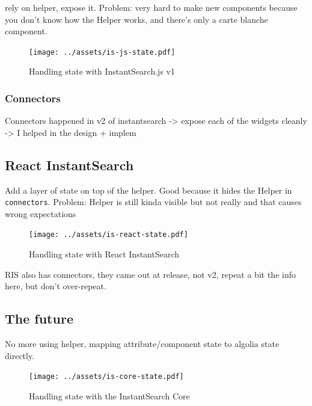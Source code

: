 rely on helper, expose it. Problem: very hard to make new components because you don't know how the Helper works, and there's only a carte blanche component. %

\begin{figure}[H]
\label{figure:is-js-state}
  \centering
  \texttt{[image: ../assets/is-js-state.pdf]}
  \caption{Handling state with InstantSearch.js v1}
\end{figure}

\subsubsection{Connectors} %
\label{ssub:instantsearch_js_connectors}

Connectors happened in v2 of instantsearch
-> expose each of the widgets cleanly
-> I helped in the design + implem %



\subsection{React InstantSearch} %
\label{sub:react_instantearch}

Add a layer of state on top of the helper. Good because it hides the Helper in {\tt connectors}. Problem: Helper is still kinda visible but not really and that causes wrong expectations %

\begin{figure}[H]
\label{figure:is-react-state}
  \centering
  \texttt{[image: ../assets/is-react-state.pdf]}
  \caption{Handling state with React InstantSearch}
\end{figure}

RIS also has connectors, they came out at release, not v2, repeat a bit the info here, but don't over-repeat. %


\subsection{The future} %
\label{sub:the_future}

No more using helper, mapping attribute/component state to algolia state directly. %

\begin{figure}[H]
\label{figure:is-core-state}
  \centering
  \texttt{[image: ../assets/is-core-state.pdf]}
  \caption{Handling state with the InstantSearch Core}
\end{figure}


